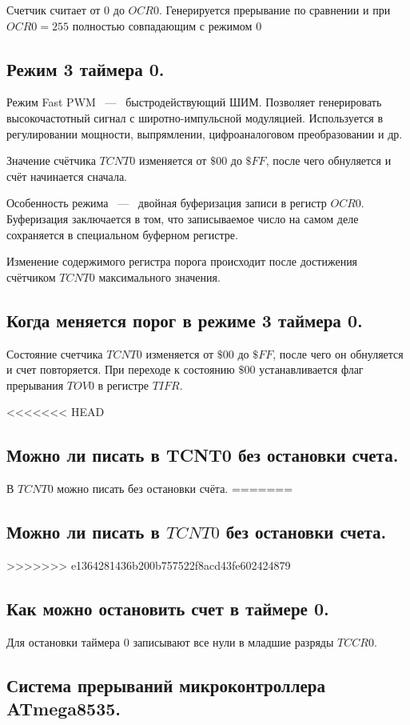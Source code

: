 Счетчик считает от $0$ до $OCR0$. Генерируется прерывание по сравнении и при $OCR0 = 255$ 
полностью совпадающим с режимом $0$

\subsection{Режим 3 таймера 0.}
Режим Fast PWM ~---~ быстродействующий ШИМ. Позволяет генерировать
высокочастотный сигнал с широтно-импульсной модуляцией. Используется 
в регулировании мощности, выпрямлении, цифроаналоговом преобразовании и др.

Значение счётчика $TCNT0$ изменяется от $\$00$ до $\$FF$, после чего 
обнуляется и счёт начинается сначала. 


Особенность режима ~---~ двойная буферизация записи в регистр $OCR0$.
Буферизация заключается в том, что записываемое число на самом деле сохраняется в
специальном буферном регистре.

Изменение содержимого регистра порога происходит после достижения 
счётчиком $TCNT0$ максимального значения. 

\subsection{Когда меняется порог в режиме 3 таймера 0.}
Состояние счетчика $TCNT0$ изменяется от $\$00$ до $\$FF$, после чего он обнуляется и счет 
повторяется. При переходе к состоянию $\$00$ устанавливается флаг прерывания $TOV0$ в 
регистре $TIFR$.

<<<<<<< HEAD

\subsection{Можно ли писать в TCNT0 без остановки счета.}
В $TCNT0$ можно писать без остановки счёта.
=======
\subsection{Можно ли писать в $TCNT0$ без остановки счета.}

>>>>>>> e1364281436b200b757522f8acd43fe602424879

\subsection{Как можно остановить счет в таймере 0.}
Для остановки таймера $0$ записывают все нули в младшие разряды $TCCR0$.

\subsection{Система прерываний микроконтроллера ATmega8535.}



